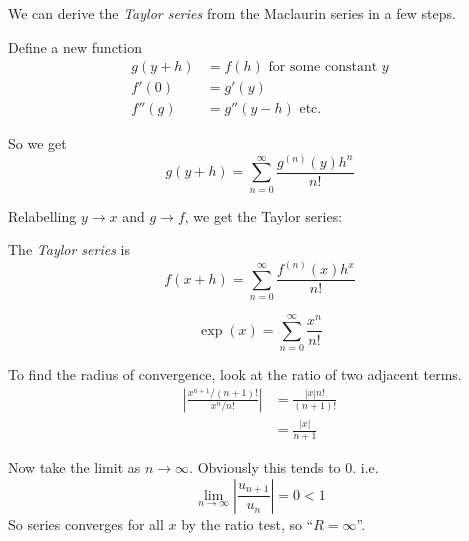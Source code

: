 \documentclass[10pt]{scrartcl}
\begin{document}
We can derive the \emph{Taylor series} from the Maclaurin series in a few steps. 

Define a new function 
\[
\begin{aligned}
  g(y + h) &= f(h) \text{ for some constant } y\\
  f'(0) &= g'(y)\\
  f''(g) &= g''(y-h) \text{ etc.} 
\end{aligned}
\]

So we get 
\[g(y+h) = \sum_{n=0}^{\infty} \frac{g^{(n)}(y)h^n}{n!}\]

Relabelling $y \to x$ and $g \to f$, we get the Taylor series:\\

\begin{definition}The \emph{Taylor series} is \[f(x+h) = \sum_{n=0}^{\infty} \frac{f^{(n)}(x)h^x}{n!}\]
\end{definition}\vspace*{5pt}

\begin{center}
\end{center}\vspace*{5pt}


\vspace*{5pt}

\begin{example}
\[\exp(x) = \sum_{n=0}^{\infty} \frac{x^n}{n!}\]

To find the radius of convergence, look at the ratio of two adjacent terms. 
\[
\begin{aligned}
  \left|\frac{x^{n+1}/(n+1)!}{x^n/n!}\right|
  &= \frac{|x|n!}{(n+1)!}\\
  &= \frac{|x|}{n+1}
\end{aligned}
\]

Now take the limit as $n \to \infty$. Obviously this tends to $0$. i.e. 
\[\lim_{n\to \infty}\left|\frac{u_{n+1}}{u_n}\right| = 0 < 1\]
So series converges for all $x$ by the ratio test, so ``$R = \infty$''. 
\end{example}\vspace*{5pt}
\end{document}
